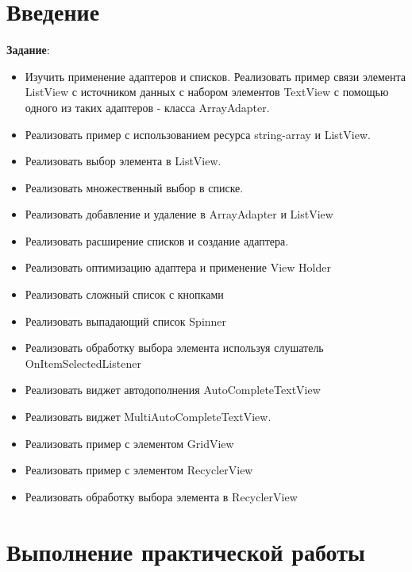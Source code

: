 \graphicspath{{./eighth/img}}

\section*{\LARGE{Введение}}

\textbf{Задание}:
\begin{itemize}
	\item Изучить применение адаптеров и списков. Реализовать пример связи
		элемента ListView с источником данных с набором элементов TextView с
		помощью одного из таких адаптеров - класса ArrayAdapter.
	\item Реализовать пример с использованием ресурса string-array и ListView.
	\item Реализовать выбор элемента в ListView.
	\item Реализовать множественный выбор в списке.
	\item Реализовать добавление и удаление в ArrayAdapter и ListView
	\item Реализовать расширение списков и создание адаптера.
	\item Реализовать оптимизацию адаптера и применение View Holder
	\item Реализовать сложный список с кнопками
	\item Реализовать выпадающий список Spinner
	\item Реализовать обработку выбора элемента используя слушатель
		OnItemSelectedListener
	\item Реализовать виджет автодополнения AutoCompleteTextView
	\item Реализовать виджет MultiAutoCompleteTextView.
	\item Реализовать пример с элементом GridView
	\item Реализовать пример с элементом RecyclerView
	\item Реализовать обработку выбора элемента в RecyclerView
\end{itemize}

\clearpage

\section*{\LARGE{Выполнение практической работы}}

